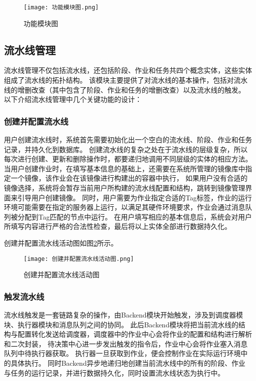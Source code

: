 \begin{figure}[h]
  \centering
  \texttt{[image: 功能模块图.png]}
  \caption{功能模块图}
  \label{fig:功能模块图}
\end{figure}

\subsection{流水线管理}

流水线管理不仅包括流水线，还包括阶段、作业和任务共四个概念实体，这些实体组成了流水线的拓扑结构。
该模块主要提供了对流水线的基本操作，包括对流水线的增删改查（其中包含了阶段、作业和任务的增删改查）以及流水线的触发。
以下介绍流水线管理中几个关键功能的设计：

\subsubsection{创建并配置流水线}
用户创建流水线时，系统首先需要初始化出一个空白的流水线、阶段、作业和任务记录，并持久化到数据库。
创建流水线的复杂之处在于流水线的层级复杂，所以每次进行创建、更新和删除操作时，都要递归地调用不同层级的实体的相应方法。
当用户创建作业时，在填写基本信息的基础上，还需要在系统所管理的镜像库中指定一个镜像，该作业会在该镜像进行构建出的容器中执行，
如果用户没有合适的镜像选择，系统将会暂存当前用户所构建的流水线配置和结构，跳转到镜像管理界面来引导用户创建镜像。
同时，用户需要为作业指定合适的Tag标签，作业的运行环境可能需要在指定的服务器上运行，以满足其硬件环境要求，作业会通过消息队列被分配到Tag匹配的节点中运行。
在用户填写相应的基本信息后，系统会对用户所填写内容进行严格的合法性检查，最后将以上实体全部进行数据持久化。

创建并配置流水线活动图如图\ref{fig:创建并配置流水线活动图}所示。

\begin{figure}[h]
  \centering
  \texttt{[image: 创建并配置流水线活动图.png]}
  \caption{创建并配置流水线活动图}
  \label{fig:创建并配置流水线活动图}
\end{figure}

\subsubsection{触发流水线}
流水线触发是一套链路复杂的操作，由Backend模块开始触发，涉及到调度器模块、执行器模块和消息队列之间的协同。
此后Backend模块将把当前流水线的结构与配置转化发送给调度器，调度器中的作业中心会将作业的配置和结构进行解析和二次封装，
待决策中心进一步发出触发的指令后，作业中心会将作业塞入消息队列中待执行器获取。
执行器一旦获取到作业，便会控制作业在实际运行环境中的具体执行。
同时Backend异步地递归地创建当前流水线中的所有的阶段、作业与任务的运行记录，并进行数据持久化，同时设置流水线状态为执行中。

